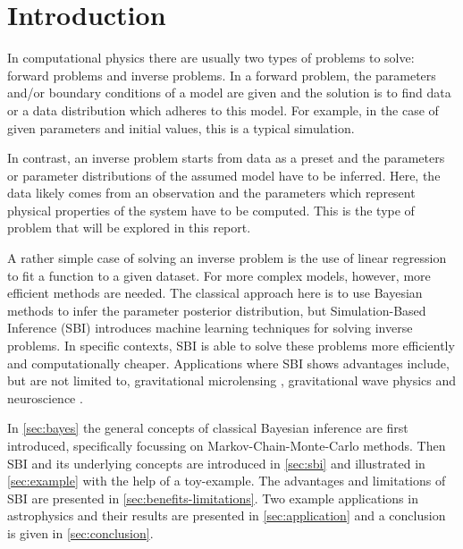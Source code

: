 \section{Introduction}%
\label{sec:intro}

In computational physics there are usually two types of problems to solve: forward problems and inverse problems.
In a forward problem, the parameters and/or boundary conditions of a model are given and the solution is to find data or a data distribution which adheres to this model. 
For example, in the case of given parameters and initial values, this is a typical simulation.

In contrast, an inverse problem starts from data as a preset and the parameters or parameter distributions of the assumed model have to be inferred.
Here, the data likely comes from an observation and the parameters which represent physical properties of the system have to be computed.
This is the type of problem that will be explored in this report.

A rather simple case of solving an inverse problem is the use of linear regression to fit a function to a given dataset.
For more complex models, however, more efficient methods are needed.
The classical approach here is to use Bayesian methods to infer the parameter posterior distribution, but Simulation-Based Inference (SBI) introduces machine learning techniques for solving inverse problems.
In specific contexts, SBI is able to solve these problems more efficiently and computationally cheaper.
Applications where SBI shows advantages include, but are not limited to, gravitational microlensing \citep{microlensing-sbi}, gravitational wave physics \citep{flow-matching-sbi} and neuroscience \citep[Sec.\,4.3]{sbi-guide}.

In \cref{sec:bayes} the general concepts of classical Bayesian inference are first introduced, specifically focussing on Markov-Chain-Monte-Carlo methods.
Then SBI and its underlying concepts are introduced in \cref{sec:sbi} and illustrated in \cref{sec:example} with the help of a toy-example.
The advantages and limitations of SBI are presented in \cref{sec:benefits-limitations}.
Two example applications in astrophysics and their results are presented in \cref{sec:application} and a conclusion is given in \cref{sec:conclusion}.


